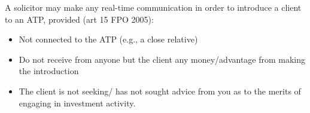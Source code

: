\documentclass[
]{article}
\providecommand{\tightlist}{%
  \setlength{\itemsep}{0pt}\setlength{\parskip}{0pt}}
\begin{document}
A solicitor may make any real-time communication in order to introduce a
client to an ATP, provided (art 15 FPO 2005):

\begin{itemize}
\tightlist
\item
  Not connected to the ATP (e.g., a close relative)
\item
  Do not receive from anyone but the client any money/advantage from
  making the introduction
\item
  The client is not seeking/ has not sought advice from you as to the
  merits of engaging in investment activity.
\end{itemize}
\end{document}
